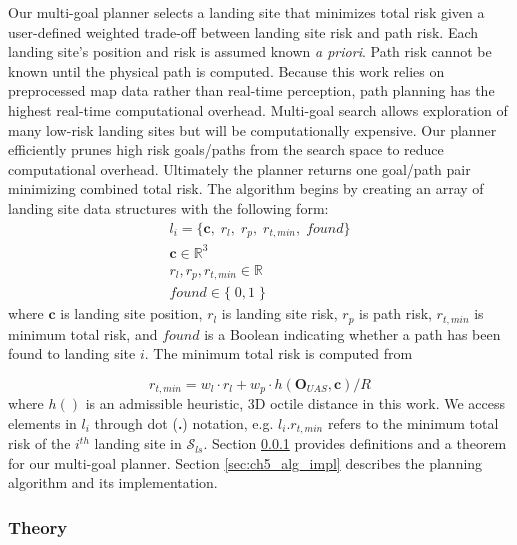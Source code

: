 Our multi-goal planner selects a landing site that minimizes total risk given a user-defined weighted trade-off between landing site risk and path risk. Each landing site's position and risk is assumed known \emph{a priori}. Path risk cannot be known until the physical path is computed. Because this work relies on preprocessed map data rather than real-time perception, path planning has the highest real-time computational overhead.
Multi-goal search allows exploration of many low-risk landing sites but will be computationally expensive. Our planner efficiently prunes high risk goals/paths from the search space to reduce computational overhead.  Ultimately the planner returns one goal/path pair minimizing combined total risk.
The algorithm begins by creating an array of landing site data structures with the following form:
\begin{align}
    l_i = \{ \mathbf{c},\; r_{l}, \;r_{p}, \; r_{t,min}, \; found \} \\
    \mathbf{c} \in \mathbb{R}^3 \\
    r_{l}, r_{p}, r_{t,min} \in \mathbb{R} \\
    found \in \{\; 0, 1 \; \} 
\end{align}
where $\mathbf{c}$ is landing site position, $r_{l}$ is landing site risk, $r_{p}$ is path risk, $r_{t,min}$ is minimum total risk, and $found$ is a Boolean indicating whether a path has been found to landing site $i$. The minimum
total risk is computed from

\begin{equation}
    r_{t,min} = w_{l} \cdot r_{l} + w_p \cdot  h(\mathbf{O}_{UAS}, \mathbf{c}) / R
\end{equation}
where $h()$ is an admissible heuristic, 3D octile distance in this work. We access elements in $l_i$ through dot (\textbf{.}) notation, e.g. $l_i.r_{t,min}$ refers to the minimum total risk of the $i^{th}$ landing site in $\mathcal{S}_{ls}$. Section \ref{sec:ch5_theorom} provides definitions and a theorem for our multi-goal planner. Section \ref{sec:ch5_alg_impl} describes the planning algorithm and its implementation.

\subsubsection{Theory}\label{sec:ch5_theorom}


